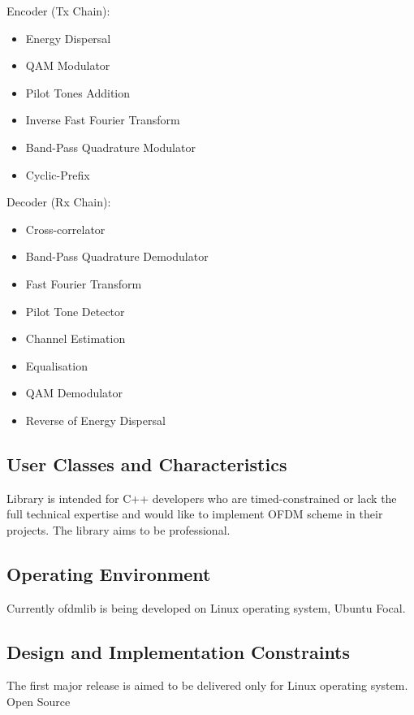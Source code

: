 \documentclass[]{report}
\begin{document}
Encoder (Tx Chain):

\begin{itemize}
	\item Energy Dispersal
	\item QAM Modulator
	\item Pilot Tones Addition
	\item Inverse Fast Fourier Transform
	\item Band-Pass Quadrature Modulator
	\item Cyclic-Prefix
\end{itemize}


Decoder (Rx Chain):

\begin{itemize}
	\item Cross-correlator 
	\item Band-Pass Quadrature Demodulator
	\item Fast Fourier Transform
	\item Pilot Tone Detector
	\item Channel Estimation
	\item Equalisation
	\item QAM Demodulator
	\item Reverse of Energy Dispersal
\end{itemize}


\subsection{User Classes and Characteristics}

Library is intended for C++ developers who are timed-constrained or lack the full technical expertise and would like to implement OFDM scheme in their projects. The library aims to be professional.


\subsection{Operating Environment}

Currently ofdmlib is being developed on Linux operating system, Ubuntu Focal.

\subsection{Design and Implementation Constraints}

The first major release is aimed to be delivered only for Linux operating system. 
Open Source
\end{document}
